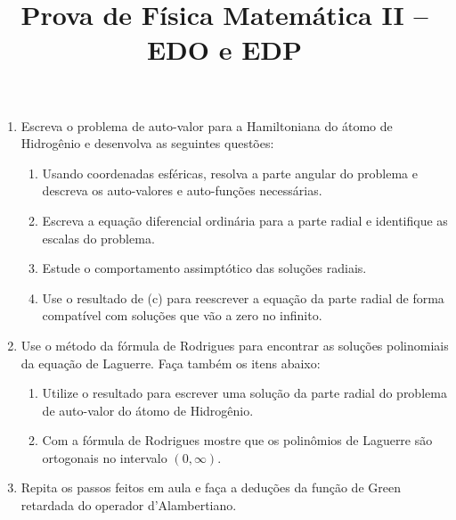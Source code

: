 \newif\ifuseseminar
\useseminartrue


\title{Prova de Física Matemática II -- EDO e EDP}



\begin{enumerate}
	\item  Escreva o problema de auto-valor para a Hamiltoniana do átomo de Hidrogênio e
	      desenvolva as seguintes questões:
	      \begin{enumerate}
		      \item Usando coordenadas esféricas, resolva a parte angular do problema e
		            descreva os auto-valores e auto-funções necessárias.
		      \item Escreva a equação diferencial ordinária para a parte radial e
		            identifique as escalas do problema.
		      \item Estude o comportamento assimptótico das soluções radiais.
		      \item Use o resultado de (c) para reescrever a equação da parte radial de
		            forma	compatível com soluções que vão a zero no infinito.
	      \end{enumerate}
	\item Use o método da fórmula de Rodrigues para encontrar as soluções polinomiais da
	      equação de Laguerre.  Faça também os itens abaixo:
	      \begin{enumerate}
		      \item Utilize o resultado para escrever uma solução da parte radial do
		            problema de auto-valor do átomo de Hidrogênio.
		      \item Com a fórmula de Rodrigues mostre que os polinômios de Laguerre são
		            ortogonais no intervalo $(0,\infty)$.
	      \end{enumerate}
	\item Repita os passos feitos em aula e faça a deduções da função de Green retardada
	      do operador d'Alambertiano.
\end{enumerate}


